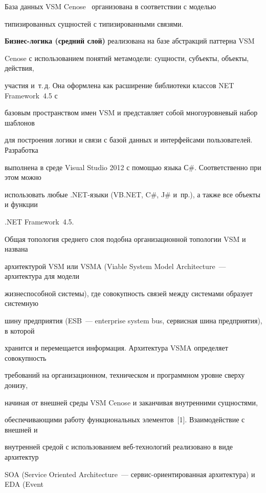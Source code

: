   


  База данных VSM Cenose~\cite{7-kl2, 21-kl2} организована в соответствии с моделью 


типизированных сущностей с типизированными связями.


  


  \textbf{Бизнес-логика (средний слой)} реализована на базе абстракций паттерна VSM 


Cenose с использованием понятий метамодели: сущности, субъекты, объекты, действия, 


участия и~т.\,д. Она оформлена как расширение библиотеки классов NET Framework~4.5 с 


базовым пространством имен VSM и представляет собой многоуровневый набор шаблонов 


для построения логики и связи с базой данных и интерфейсами пользователей. Разработка 


выполнена в среде Visual Studio 2012 с помощью языка С\#. Соответственно при этом можно 


использовать любые .NET-язы\-ки (VB.NET, C\#, J\# и~пр.), а также все объекты и функции 


.NET Framework~4.5. 


  


  Общая топология среднего слоя подобна организационной топологии VSM и названа 


архитектурой VSM или VSMA (Viable System Model Architecture~--- архитектура для модели 


жизнеспособной сис\-те\-мы), где совокупность связей между сис\-те\-ма\-ми образует сис\-тем\-ную 


шину предприятия (ESB~--- enterprise system bus, сервисная шина предприятия), в которой 


хранится и перемещается информация. Архитектура VSMA определяет совокупность 


требований на организационном, техническом и программном уровне сверху донизу, 


начиная от внешней среды VSM Cenose и заканчивая внутренними сущностями, 


обеспечивающими работу функциональных элементов~[1]. Взаимодействие с внешней и 


внутренней средой с использованием веб-тех\-но\-ло\-гий реализовано в виде архитектур 


SOA (Service Oriented Architecture~--- сервис-ориентированная архитектура) и EDA (Event 


